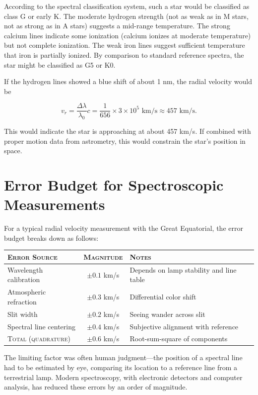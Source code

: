 According to the spectral classification system, such a star would be classified as class G or early K. The moderate hydrogen strength (not as weak as in M stars, not as strong as in A stars) suggests a mid-range temperature. The strong calcium lines indicate some ionization (calcium ionizes at moderate temperature) but not complete ionization. The weak iron lines suggest sufficient temperature that iron is partially ionized. By comparison to standard reference spectra, the star might be classified as G5 or K0.

If the hydrogen lines showed a blue shift of about 1 nm, the radial velocity would be

\[
  v_r = \frac{\Delta \lambda}{\lambda_0} c = \frac{1}{656} \times 3 \times 10^5 \text{ km/s} \approx 457 \text{ km/s}.
\]

This would indicate the star is approaching at about 457 km/s. If combined with proper motion data from astrometry, this would constrain the star's position in space.

\section{Error Budget for Spectroscopic Measurements}

For a typical radial velocity measurement with the Great Equatorial, the error budget breaks down as follows:

\begin{center}
\begin{tabularx}{\linewidth}{lcX}
\hline
\textsc{Error Source} & \textsc{Magnitude} & \textsc{Notes} \\
\hline
Wavelength calibration & $\pm 0.1$ km/s & Depends on lamp stability and line table \\
Atmospheric refraction & $\pm 0.3$ km/s & Differential color shift \\
Slit width & $\pm 0.2$ km/s & Seeing wander across slit \\
Spectral line centering & $\pm 0.4$ km/s & Subjective alignment with reference \\
\hline
\textsc{Total (quadrature)} & $\pm 0.6$ km/s & Root-sum-square of components \\
\hline
\end{tabularx}
\end{center}

The limiting factor was often human judgment—the position of a spectral line had to be estimated by eye, comparing its location to a reference line from a terrestrial lamp. Modern spectroscopy, with electronic detectors and computer analysis, has reduced these errors by an order of magnitude.

